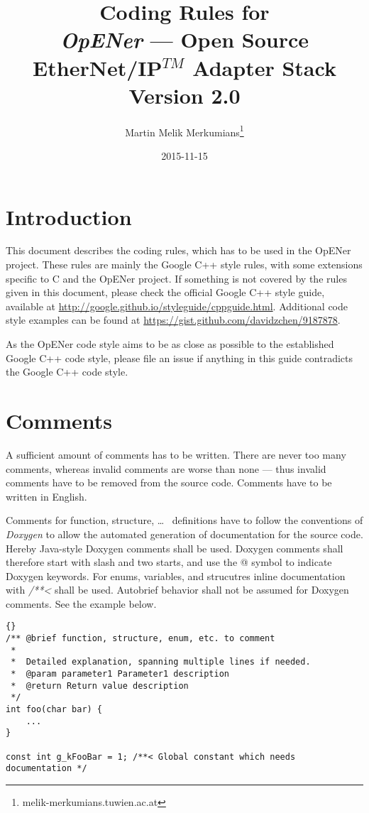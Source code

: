 \documentclass[final,a4paper,10pt, oneside]{article}
\title{Coding Rules for\\ \emph{OpENer} --- Open Source EtherNet/IP$^{TM}$ Adapter Stack\\\large Version 2.0}
\author{Martin Melik Merkumians\thanks{melik-merkumians\@@acin.tuwien.ac.at}}
\date{2015-11-15}
\begin{document}
\maketitle

\tableofcontents

\section{Introduction}
This document describes the coding rules, which has to be used in the OpENer project. These rules are mainly the Google C++ style rules, with some extensions specific to C and the OpENer project. If something is not covered by the rules given in this document, please check the official Google C++ style guide, available at \url{http://google.github.io/styleguide/cppguide.html}. Additional code style examples can be found at \url{https://gist.github.com/davidzchen/9187878}.

As the OpENer code style aims to be as close as possible to the established Google C++ code style, please file an issue if anything in this guide contradicts the Google C++ code style.

\section{Comments}
A sufficient amount of comments has to be written. There are never too many comments, whereas invalid comments are worse than none --- thus invalid comments have to be removed from the source code. Comments have to be written in English. 


Comments for function, structure, \ldots~ definitions have to follow the conventions of \emph{Doxygen} to allow the automated generation of documentation for the source code. Hereby Java-style Doxygen comments shall be used. Doxygen comments shall therefore start with slash and two starts, and use the @ symbol to indicate Doxygen keywords. For enums, variables, and strucutres inline documentation with \emph{/**<} shall be used. Autobrief behavior shall not be assumed for Doxygen comments. See the example below.
\begin{lstlisting}[frame=trbl]{}
/** @brief function, structure, enum, etc. to comment
 *
 *  Detailed explanation, spanning multiple lines if needed.
 *  @param parameter1 Parameter1 description
 *  @return Return value description
 */
int foo(char bar) {
    ...
}

const int g_kFooBar = 1; /**< Global constant which needs documentation */

\end{lstlisting}
\end{document}

